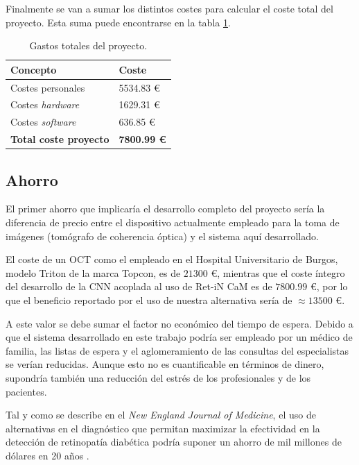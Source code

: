 Finalmente se van a sumar los distintos costes para calcular el coste total del proyecto. Esta suma puede encontrarse en la tabla \ref{tab:cost_total}.

\begin{table}[h]
\centering
\begin{tabular}{@{}ll@{}}
\toprule
\rowcolor[HTML]{C0C0C0} 
Concepto                      & Coste              \\ \midrule
Costes personales             & 5534.83 €          \\
Costes \textit{hardware}      & 1629.31 €          \\
Costes \textit{software}      & 636.85 €           \\ \midrule
\textbf{Total coste proyecto} & \textbf{7800.99 €} \\ \bottomrule
\end{tabular}
\caption{Gastos totales del proyecto.}
\label{tab:cost_total}
\end{table}

\subsection{Ahorro}

El primer ahorro que implicaría el desarrollo completo del proyecto sería la diferencia de precio entre el dispositivo actualmente empleado para la toma de imágenes (tomógrafo de coherencia óptica) y el sistema aquí desarrollado.

El coste de un OCT como el empleado en el Hospital Universitario de Burgos, modelo Triton de la marca Topcon, es de $21300$ €, mientras que el coste íntegro del desarrollo de la CNN acoplada al uso de Ret-iN CaM es de $7800.99$ €, por lo que el beneficio reportado por el uso de nuestra alternativa sería de $ \approx 13500$ €.

A este valor se debe sumar el factor no económico del tiempo de espera. Debido a que el sistema desarrollado en este trabajo podría ser empleado por un médico de familia, las listas de espera y el aglomeramiento de las consultas del especialistas se verían reducidas. Aunque esto no es cuantificable en términos de dinero, supondría también una reducción del estrés de los profesionales y de los pacientes.

Tal y como se describe en el \textit{New England Journal of Medicine}, el uso de alternativas en el diagnóstico que permitan maximizar la efectividad en la detección de retinopatía diabética podría suponer un ahorro de mil millones de dólares en 20 años \cite{ahorro}.

